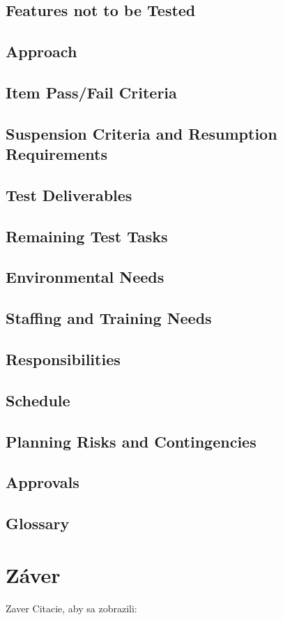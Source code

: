 \section{Features not to be Tested}
\section{Approach}
\section{Item Pass/Fail Criteria}
\section{Suspension Criteria and Resumption Requirements}
\section{Test Deliverables}
\section{Remaining Test Tasks}
\section{Environmental Needs}
\section{Staffing and Training Needs}
\section{Responsibilities}
\section{Schedule}
\section{Planning Risks and Contingencies}
\section{Approvals}
\section{Glossary}

\chapter{Záver}
Zaver
Citacie, aby sa zobrazili: \cite{Testovani_softwaru} \cite{Software_testing} \cite{Software_testing_patton}

